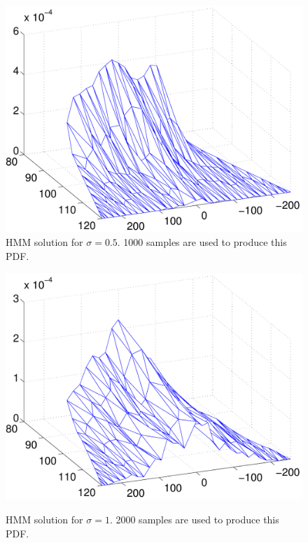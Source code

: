 \begin{figure}
\begin{center}
\includegraphics[width=\textwidth]{figures/hmm_pdf_sigma_p5}
\end{center}
\caption{HMM solution for $\sigma = 0.5$. 1000 samples are used to produce this PDF.}
\label{f:hmm sigma=.5}
\end{figure}

\begin{figure}
\begin{center}
\label{f:hmm sigma=1}
\includegraphics[width=\textwidth]{figures/hmm_pdf_sigma_1}
\end{center}
\caption{HMM solution for $\sigma = 1$. 2000 samples are used to produce this PDF.}
\end{figure}

